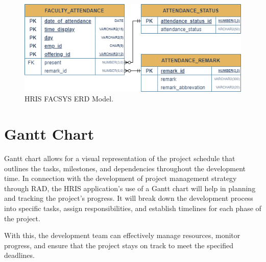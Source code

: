 \begin{figure}[H]
    \centering
    \includegraphics[width=1\linewidth]{figures/images/erd-facsys.png}
    \caption{HRIS FACSYS ERD Model.}
    \label{fig:erd-facsys}
\end{figure}
    
\section{Gantt Chart}

Gantt chart allows for a visual representation of the project schedule that outlines the tasks, milestones, and dependencies throughout the development time. In connection with the development of project management strategy through RAD, the HRIS application's use of a Gantt chart will help in planning and tracking the project's progress. It will break down the development process into specific tasks, assign responsibilities, and establish timelines for each phase of the project.

With this, the development team can effectively manage resources, monitor progress, and ensure that the project stays on track to meet the specified deadlines.

